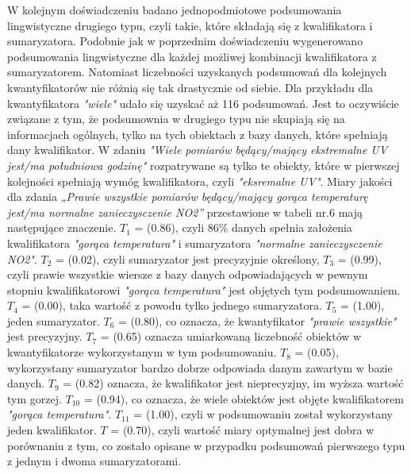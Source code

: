 \documentclass{article}
\begin{document}
W kolejnym doświadczeniu badano jednopodmiotowe podsumowania lingwistyczne drugiego typu, czyli takie, które składają się z kwalifikatora i sumaryzatora. Podobnie jak w poprzednim doświadczeniu wygenerowano podsumowania lingwistyczne dla każdej możliwej kombinacji kwalifikatora z sumaryzatorem. Natomiast liczebności uzyskanych podsumowań dla kolejnych kwantyfikatorów nie różnią się tak drastycznie od siebie. Dla przykładu dla kwantyfikatora \textit{"wiele"} udało się uzyskać aż 116 podsumowań. Jest to oczywiście związane z tym, że podsumownia w drugiego typu nie skupiają się na informacjach ogólnych, tylko na tych obiektach z bazy danych, które spełniają dany kwalifikator. W zdaniu \textit{"Wiele pomiarów będący/mający ekstremalne UV jest/ma południowa godzinę"} rozpatrywane są tylko te obiekty, które w pierwszej kolejności spełniają wymóg kwalifikatora, czyli \textit{"eksremalne UV"}. Miary jakości dla zdania \textit{„Prawie wszystkie pomiarów będący/mający gorąca temperaturę jest/ma normalne zanieczysczenie NO2”} przestawione w tabeli nr.6 mają następujące znaczenie. \(T_1\) = (0.86), czyli 86\% danych spełnia założenia kwalifikatora \textit{"gorąca temperatura"} i sumaryzatora \textit{"normalne zanieczysczenie NO2"}. \(T_2\) = (0.02), czyli sumaryzator jest precyzyjnie określony, \(T_3\) = (0.99), czyli prawie wszystkie wiersze z bazy danych odpowiadających w pewnym stopniu kwalifikatorowi \textit{"gorąca temperatura"} jest objętych tym podsumowaniem.\(T_4\) = (0.00), taka wartość z powodu tylko jednego sumaryzatora. \(T_5\) = (1.00), jeden sumaryzator. \(T_6\) = (0.80), co oznacza, że kwantyfikator \textit{"prawie wszystkie"} jest precyzyjny. \(T_7\) = (0.65) oznacza umiarkowaną liczebność obiektów w kwantyfikatorze wykorzystanym w tym podsumowaniu. \(T_8\) = (0.05), wykorzystany sumaryzator bardzo dobrze odpowiada danym zawartym w bazie danych. \(T_9\) = (0.82) oznacza, że kwalifikator jest nieprecyzjny, im wyższa wartość tym gorzej. \(T_{10}\) = (0.94), co oznacza, że wiele obiektów jest objęte kwalifikatorem \textit{"gorąca temperatura"}. \(T_{11}\) = (1.00), czyli w podsumowaniu został wykorzystany jeden kwalifikator. \(T\) = (0.70), czyli wartość miary optymalnej jest dobra w porównaniu z tym, co zostało opisane w przypadku podsumowań pierwszego typu z jednym i dwoma sumaryzatorami. 
\end{document}
